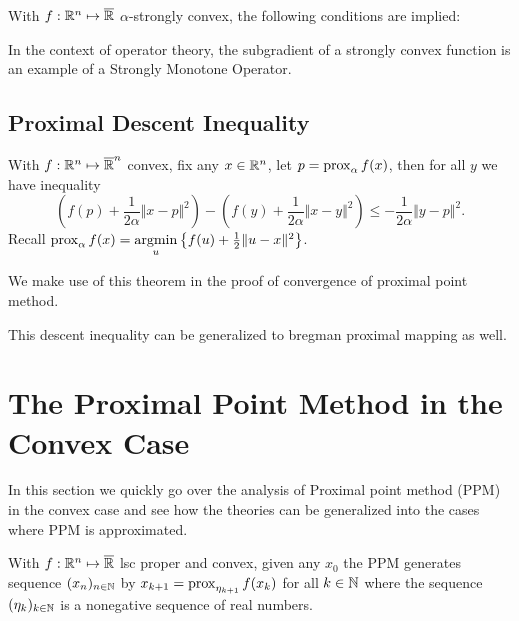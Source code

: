 \documentclass[12pt]{article}
\begin{document}
        \begin{theorem}
            With $f:\mathbb R^n \mapsto \overline {\mathbb R}$ $\alpha$-strongly convex, the following conditions are implied: 
            
        \end{theorem}
        \begin{remark}
            In the context of operator theory, the subgradient of a strongly convex function is an example of a Strongly Monotone Operator. 
        \end{remark}
    \subsection{Proximal Descent Inequality}
        \begin{theorem}\label{thm:prox_descent_ineq}
            With $f: \mathbb R^n \mapsto \overline {\mathbb R}^n$ convex, fix any $x \in \mathbb R^n$, let $p = \operatorname{prox}_\alpha f(x)$, then for all $y$ we have inequality 
            $$
                \left(f(p) + \frac{1}{2\alpha}\Vert x - p\Vert^2\right)
                - 
                \left(
                    f(y) + \frac{1}{2\alpha}\Vert x - y\Vert^2 
                \right)
                \le 
                - \frac{1}{2\alpha}\Vert y - p\Vert^2. 
            $$
            Recall $\operatorname{prox}_\alpha f(x) = \mathop{\rm argmin}\limits_{u}\left\lbrace f(u) + \frac{1}{2}\Vert u - x\Vert^2 \right\rbrace$. 
        \end{theorem}
        We make use of this theorem in the proof of convergence of proximal point method.     
        \begin{remark}
            This descent inequality can be generalized to bregman proximal mapping as well. 
        \end{remark}


\section{The Proximal Point Method in the Convex Case}
    In this section we quickly go over the analysis of Proximal point method (PPM) in the convex case and see how the theories can be generalized into the cases where PPM is approximated. 
    \par
    With $f: \mathbb R^n \mapsto \overline {\mathbb R}$ lsc proper and convex, 
    given any $x_0$ the PPM generates sequence $(x_n)_{n\in \mathbb N}$ by $x_{k + 1} = \operatorname{prox}_{\eta_{k + 1}}f(x_k)$ for all $k \in \mathbb N$ where the sequence $(\eta_{k})_{k \in \mathbb N}$ is a nonegative sequence of real numbers. 
\end{document}

